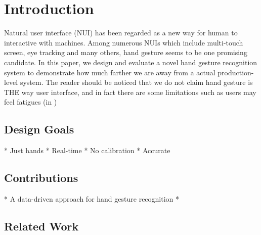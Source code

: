 \section{Introduction}
Natural user interface (NUI) has been regarded as a new way for human to interactive with machines. Among numerous NUIs which include multi-touch screen, eye tracking and many others, hand gesture seems to be one promising candidate. In this paper, we design and evaluate a novel hand gesture recognition system to demonstrate how much farther we are away from a actual production-level system. The reader should be noticed that we do not claim hand gesture is THE way user interface, and in fact there are some limitations such as users may feel fatigues (in )

\subsection{Design Goals}
* Just hands
* Real-time
* No calibration
* Accurate
\subsection{Contributions}
* A data-driven approach for hand gesture recognition
* 
\subsection{Related Work}
 